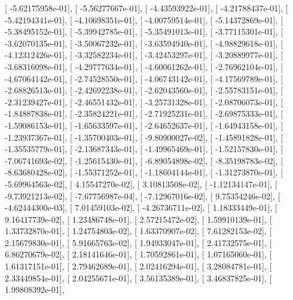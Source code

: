 \documentclass{article}
\begin{document}
       [ -5.62175958e-01],
       [ -5.56277667e-01],
       [ -4.43593922e-01],
       [ -4.21788437e-01],
       [ -5.42194341e-01],
       [ -4.10698351e-01],
       [ -4.00759514e-01],
       [ -5.14372869e-01],
       [ -5.38495152e-01],
       [ -5.39942785e-01],
       [ -5.35491013e-01],
       [ -3.77115301e-01],
       [ -3.62070135e-01],
       [ -3.50067232e-01],
       [ -3.63594940e-01],
       [ -4.98829618e-01],
       [ -4.12312426e-01],
       [ -3.32582234e-01],
       [ -3.42453297e-01],
       [ -3.20889977e-01],
       [ -3.68316098e-01],
       [ -4.29777634e-01],
       [ -4.60061262e-01],
       [ -2.76962104e-01],
       [ -4.67064142e-01],
       [ -2.74528550e-01],
       [ -4.06743142e-01],
       [ -4.17569789e-01],
       [ -2.68826513e-01],
       [ -2.42692238e-01],
       [ -2.62043560e-01],
       [ -2.55783151e-01],
       [ -2.31239427e-01],
       [ -2.46551432e-01],
       [ -3.25731328e-01],
       [ -2.08706073e-01],
       [ -1.84887838e-01],
       [ -2.35824221e-01],
       [ -2.71925231e-01],
       [ -2.69875333e-01],
       [ -1.59086153e-01],
       [ -1.65633597e-01],
       [ -2.64652637e-01],
       [ -1.64943158e-01],
       [ -1.23937367e-01],
       [ -1.35700403e-01],
       [ -9.80900027e-02],
       [ -1.45891828e-01],
       [ -1.35535779e-01],
       [ -2.13687343e-01],
       [ -1.49965469e-01],
       [ -1.52157830e-01],
       [ -7.06741693e-02],
       [ -1.25615430e-01],
       [ -6.89054898e-02],
       [ -8.35198783e-02],
       [ -8.63680428e-02],
       [ -1.55371252e-01],
       [ -1.18604144e-01],
       [ -1.31273870e-01],
       [ -5.69964563e-02],
       [  4.15547270e-02],
       [  3.10813508e-02],
       [ -1.12134147e-01],
       [ -9.73921213e-02],
       [ -7.67756987e-04],
       [ -7.12967016e-02],
       [  9.75354246e-02],
       [ -4.62444300e-03],
       [  7.01459103e-02],
       [ -4.26736711e-02],
       [  1.18333449e-01],
       [  9.16417739e-02],
       [  1.23486748e-01],
       [  2.57215472e-02],
       [  1.59910139e-01],
       [  1.33732870e-01],
       [  1.24754803e-02],
       [  1.63370907e-02],
       [  7.61282153e-02],
       [  2.15679830e-01],
       [  5.91665763e-02],
       [  1.94933047e-01],
       [  2.41732575e-01],
       [  6.86270679e-02],
       [  2.18141646e-01],
       [  1.70592861e-01],
       [  1.07165060e-01],
       [  1.61317151e-01],
       [  2.79462689e-01],
       [  2.02416294e-01],
       [  3.28084781e-01],
       [  2.33449854e-01],
       [  2.04255671e-01],
       [  3.56135389e-01],
       [  3.46837825e-01],
       [  1.99808392e-01],
\end{document}
